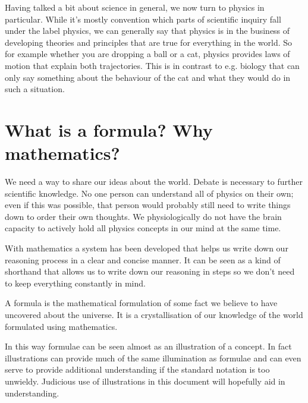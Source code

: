 \documentclass{report}
\begin{document}
Having talked a bit about science in general, we now turn to physics in particular. While it's mostly convention which parts of scientific inquiry fall under the label physics, we can generally say that physics is in the business of developing theories and principles that are true for everything in the world. So for example whether you are dropping a ball or a cat, physics provides laws of motion that explain both trajectories. This is in contrast to e.g. biology that can only say something about the behaviour of the cat and what they would do in such a situation.

\section{What is a formula? Why mathematics?}
We need a way to share our ideas about the world. Debate is necessary to further scientific knowledge. No one person can understand all of physics on their own; even if this was possible, that person would probably still need to write things down to order their own thoughts. We physiologically do not have the brain capacity to actively hold all physics concepts in our mind at the same time.

With mathematics a system has been developed that helps us write down our reasoning process in a clear and concise manner. It can be seen as a kind of shorthand that allows us to write down our reasoning in steps so we don't need to keep everything constantly in mind.

A formula is the mathematical formulation of some fact we believe to have uncovered about the universe. It is a crystallisation of our knowledge of the world formulated using mathematics.

In this way formulae can be seen almost as an illustration of a concept. In fact illustrations can provide much of the same illumination as formulae and can even serve to provide additional understanding if the standard notation is too unwieldy. Judicious use of illustrations in this document will hopefully aid in understanding.
\end{document}
